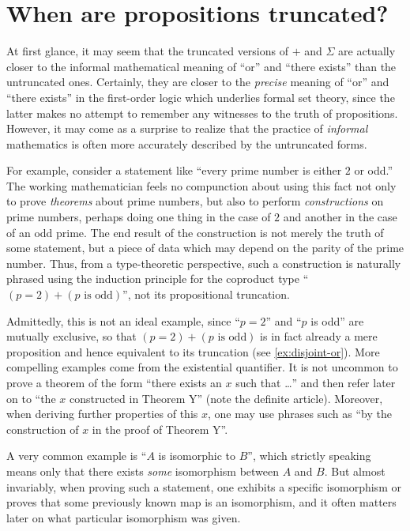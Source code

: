 %


\section{When are propositions truncated?}
\label{subsec:when-trunc}

%
%

At first glance, it may seem that the truncated versions of $+$ and $\Sigma$ are actually closer to the informal mathematical meaning of ``or'' and ``there exists'' than the untruncated ones.
Certainly, they are closer to the \emph{precise} meaning of ``or'' and ``there exists'' in the first-order logic  which underlies formal set theory, since the latter makes no attempt to remember any witnesses to the truth of propositions.
However, it may come as a surprise to realize that the practice of \emph{informal} mathematics is often more accurately described by the untruncated forms.

%
For example, consider a statement like ``every prime number is either $2$ or odd.''
The working mathematician feels no compunction about using this fact not only to prove \emph{theorems} about prime numbers, but also to perform \emph{constructions} on prime numbers, perhaps doing one thing in the case of $2$ and another in the case of an odd prime.
The end result of the construction is not merely the truth of some statement, but a piece of data which may depend on the parity of the prime number.
Thus, from a type-theoretic perspective, such a construction is naturally phrased using the induction principle for the coproduct type ``$(p=2)+(p\text{ is odd})$'', not its propositional truncation.

Admittedly, this is not an ideal example, since ``$p=2$'' and ``$p$ is odd'' are mutually exclusive, so that $(p=2)+(p\text{ is odd})$ is in fact already a mere proposition and hence equivalent to its truncation (see \autoref{ex:disjoint-or}).
More compelling examples come from the existential quantifier.
It is not uncommon to prove a theorem of the form ``there exists an $x$ such that \dots'' and then refer later on to ``the $x$ constructed in Theorem Y'' (note the definite article).
Moreover, when deriving further properties of this $x$, one may use phrases such as ``by the construction of $x$ in the proof of Theorem Y''.

A very common example is ``$A$ is isomorphic to $B$'', which strictly speaking means only that there exists \emph{some} isomorphism between $A$ and $B$.
But almost invariably, when proving such a statement, one exhibits a specific isomorphism or proves that some previously known map is an isomorphism, and it often matters later on what particular isomorphism was given.

